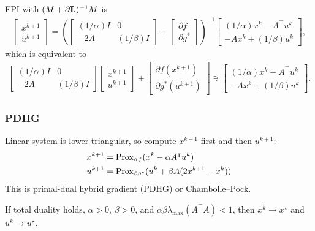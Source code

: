 \documentclass[10pt,mathserif]{beamer}
\begin{document}
\begin{frame}[label=frame_pdhg2]
FPI with $(M+\partial \mathbf{L})^{-1}M$ is
\begin{align*}
\begin{bmatrix}
x^{k+1}\\
 u ^{k+1}
\end{bmatrix}=
\left(
\begin{bmatrix}
(1/\alpha) I&0\\
-2A&(1/\beta) I
\end{bmatrix}
+
\begin{bmatrix}
\partial f\\
\partial g^*
\end{bmatrix}
\right)^{-1}
\begin{bmatrix}
(1/\alpha) x^k-A^\intercal u ^k\\
-Ax^k+(1/\beta)  u ^k
\end{bmatrix},
\end{align*}
which is equivalent to
\begin{align*}
\begin{bmatrix}
(1/\alpha) I&0\\
-2A&(1/\beta) I
\end{bmatrix}
\begin{bmatrix}
x^{k+1}\\
 u ^{k+1}
\end{bmatrix}
+
\begin{bmatrix}
\partial f(x^{k+1})\\
\partial g^*( u ^{k+1})
\end{bmatrix}
\ni
\begin{bmatrix}
(1/\alpha) x^k-A^\intercal u ^k\\
-Ax^k+(1/\beta)  u ^k
\end{bmatrix}.
\end{align*}
\end{frame}

\begin{frame}
\frametitle{PDHG}
Linear system is lower triangular, so compute $x^{k+1}$ first and then $ u ^{k+1}$:
\begin{align*}
x^{k+1}&=
\mathrm{Prox}_{\alpha f}(x^k-\alpha A^\intercal u ^k)\\
 u ^{k+1}&=
\mathrm{Prox}_{\beta g^*}( u ^k+\beta A(2x^{k+1}-x^k))
\end{align*}
This is primal-dual hybrid gradient (PDHG) or Chambolle--Pock.

\vspace{0.2in}
If total duality holds,
$\alpha>0$, $\beta>0$, and
$\alpha\beta\lambda_\mathrm{max}(A^\intercal A)<1$,
then $x^k\rightarrow x^\star$ and $ u ^k\rightarrow  u ^\star$.
\end{frame}
\end{document}
